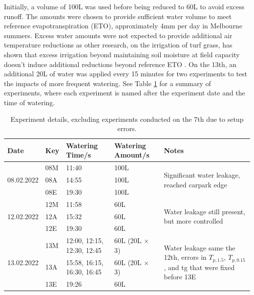 \documentclass[final,3p,times,authoryear]{elsarticle}
\begin{document}
Initially, a volume of 100L was used before being reduced to 60L to avoid excess runoff. The amounts were chosen to provide sufficient water volume to meet reference evapotranspiration (ETO), approximately 4mm per day in Melbourne summers. Excess water amounts were not expected to provide additional air temperature reductions as other research, on the irrigation of turf grass, has shown that excess irrigation beyond maintaining soil moisture at field capacity doesn’t induce additional reductions beyond reference ETO \citep{CHEUNG2022101310}. On the 13th, an additional 20L of water was applied every 15 minutes for two experiments to test the impacts of more frequent watering. See Table \ref{table:2.2} for a summary of experiments, where each experiment is named after the experiment date and the time of watering.

\begin{table}[!ht]\caption{Experiment details, excluding experiments conducted on the 7th due to setup errors.}
    \centering
    \begin{tabular}{|p{2.0cm}|p{3cm}|p{2.0cm}|p{2.0cm}|p{5cm}|}
    \hline
        Date & Key & Watering Time/s & Watering Amount/s & Notes \\ \hline
        \multirow{3}{2pt}{08.02.2022} & 08M & 11:40 & 100L & \multirow{3}{*}{\parbox{4cm}{Significant water leakage, reached carpark edge}} \\
         ~ & 08A & 14:55 & 100L & ~ \\ 
         ~ & 08E & 19:30 & 100L & ~ \\ \hline
         \multirow{3}{2pt}{12.02.2022} & 12M & 11:58 & 60L & \multirow{3}{*}{\parbox{4cm}{Water leakage still present, but more controlled}} \\
          ~ & 12A & 15:32 & 60L & ~ \\ 
          ~ & 12E & 19:30 & 60L & ~ \\ \hline
        \multirow{3}{2pt}{13.02.2022} & 13M & 12:00, 12:15, 12:30, 12:45 & 60L (20L $\times$ 3) & \multirow{3}{*}{\parbox{4cm}{Water leakage same the 12th, errors in $T_{p,1.5}$, $T_{p,0.15}$, and \gls{tg} that were fixed before 13E}} \\
         ~ & 13A & 15:58, 16:15, 16:30, 16:45 & 60L (20L $\times$ 3) & ~ \\ 
         ~ & 13E & 19:26 & 60L & ~ \\ \hline
    \end{tabular}\label{table:2.2}
\end{table}
\end{document}
